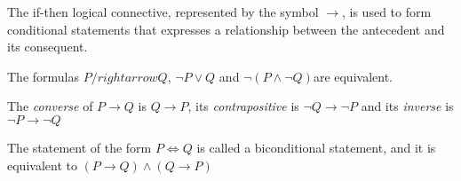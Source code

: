 The if-then logical connective, represented by the symbol \(\rightarrow\), is used to form conditional statements that expresses a relationship between the antecedent and its consequent.

The formulas \(P /rightarrow Q\), \(\lnot P \lor Q\) and \(\lnot (P \land \lnot Q)\)are equivalent.

The \textit{converse} of \(P \rightarrow Q\) is \(Q \rightarrow P\), its \textit{contrapositive} is \(\lnot Q \rightarrow \lnot P\) and its \textit{inverse} is \(\lnot P \rightarrow \lnot Q\)

The statement of the form \(P \iff Q\) is called a biconditional statement, and it is equivalent to \((P \rightarrow Q) \land (Q \rightarrow P)\)